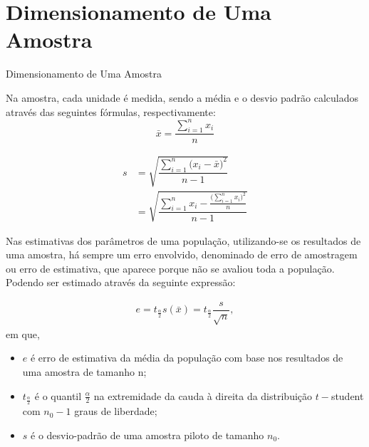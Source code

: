 \documentclass[14pt,aspectratio=1610]{beamer}
\begin{document}
\section{Dimensionamento de Uma Amostra}
\begin{frame}{Dimensionamento de Uma Amostra}
    \begin{block}{}
    \justifying
\begin{minipage}[t]{0.45\textwidth}
Na amostra, cada unidade é medida, sendo a média e o desvio padrão calculados
através das seguintes fórmulas, respectivamente:
\smallskip
$$\bar{x}=\dfrac{\displaystyle{\sum_{i=1}^{n}x_{i}}}{n}$$
\end{minipage}%
\begin{minipage}[t]{0.5\textwidth}
\begin{align*}
s&=\sqrt{\dfrac{\displaystyle{\sum_{i=1}^{n}\Big(x_{i}-\bar{x}\Big)^{2}}}{n-1}}\\
&=\sqrt{\dfrac{\displaystyle{\sum_{i=1}^{n}x_{i}-\frac{\Big(\displaystyle{\sum_{i=1}^{n}x_{i}}\Big)^{2}}{n}}}{n-1}}   
\end{align*}
\end{minipage}
    \end{block}
\end{frame}

\begin{frame}{}
\begin{block}{}
\justifying
Nas estimativas dos parâmetros de uma população, utilizando-se os resultados de uma amostra, há sempre um erro envolvido, denominado de erro de amostragem ou erro de estimativa, que aparece porque não se avaliou toda a população. Podendo ser estimado através da seguinte expressão:
\end{block}
\pause
\begin{block}{}
\begin{align*}
e=t_{\frac{\alpha}{2}}s(\bar{x})=t_{\frac{\alpha}{2}}\dfrac{s}{\sqrt{n}},
\end{align*}
em que,\pause
\begin{itemize}[label={}]
    \item $e$ é erro de estimativa da média da população com base nos resultados de uma amostra de tamanho n;\pause
    \item $t_{\frac{\alpha}{2}}$ é o quantil $\frac{\alpha}{2}$ na extremidade da cauda à direita da distribuição $t-$student com $n_{0}-1$ graus de liberdade;\pause
    \item $s$ é o desvio-padrão de uma amostra piloto de tamanho $n_{0}.$
\end{itemize}
\end{block}
\end{frame}
\end{document}
